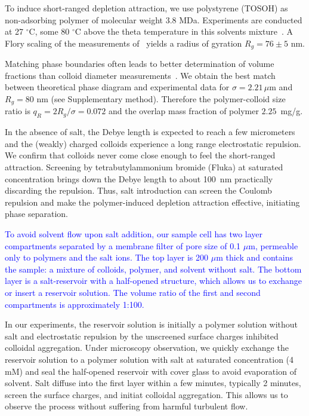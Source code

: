 \documentclass[preprint,amsmath,amssymb,superscriptaddress]{revtex4-1}
\begin{document}
To induce short-ranged depletion attraction, we use polystyrene (TOSOH) as non-adsorbing polymer of molecular weight 3.8 MDa.
Experiments are conducted at 27 $^\circ$C, some 80 $^\circ$C above the theta temperature in this solvents mixture~\cite{Royall2007}. A Flory scaling of the measurements of~\cite{lu2008gelation} yields a radius of gyration $R_g=76\pm5$ nm.

Matching phase boundaries often leads to better determination of volume fractions than colloid diameter measurements~\cite{Poon2012}. We obtain the best match between theoretical phase diagram and experimental data for $\sigma=2.21\,\mu$m and $R_g=80$ nm (see Supplementary method). Therefore the polymer-colloid size ratio is $q_R=2R_g/\sigma=0.072$ and the overlap mass fraction of polymer $2.25$~mg/g.

In the absence of salt, the Debye length is expected to reach a few micrometers and the (weakly) charged colloids experience a long range electrostatic repulsion. We confirm that colloids never come close enough to feel the short-ranged attraction. Screening by tetrabutylammonium bromide (Fluka) at saturated concentration brings down the Debye length to about 100~nm practically discarding the repulsion. 
Thus, salt introduction can screen the Coulomb repulsion and make the polymer-induced depletion attraction effective, initiating phase separation. 

\textcolor{blue}{To avoid solvent flow upon salt addition, our sample cell has two layer compartments separated by a membrane filter of pore size of 0.1 $\mu$m, permeable only to polymers and the salt ions. The top layer is 200 $\mu$m thick and contains the sample: a mixture of colloids, polymer, and solvent without salt. The bottom layer is a salt-reservoir with a half-opened structure, which allows us to exchange or insert a reservoir solution. The volume ratio of the first and second compartments is approximately 1:100.}

In our experiments, the reservoir solution is initially a polymer solution without salt and electrostatic repulsion by the unscreened surface charges inhibited colloidal aggregation. Under microscopy observation, we quickly exchange the reservoir solution to a polymer solution with salt at saturated concentration (4 mM) and seal the half-opened reservoir with cover glass to avoid evaporation of solvent. Salt diffuse into the first layer within a few minutes, typically 2 minutes, screen the surface charges, and initiat colloidal aggregation. This allows us to observe the process without suffering from harmful turbulent flow.
\end{document}
